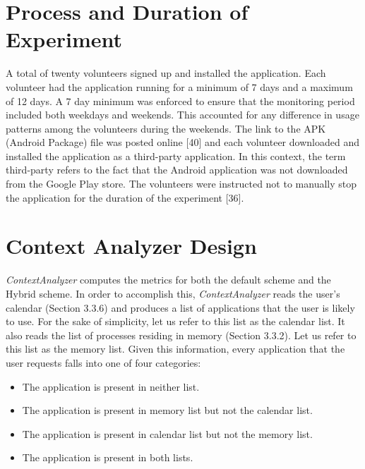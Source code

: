 \documentclass[12pt]{uthesis-v12}  %
\begin{document}
	\section{Process and Duration of Experiment}
		A total of twenty volunteers signed up and installed the application. Each volunteer had the application running for a minimum of 7 days and a maximum of 12 days. A 7 day minimum was enforced to ensure that the monitoring period included both weekdays and weekends. This accounted for any difference in usage patterns among the volunteers during the weekends. The link to the APK (Android Package) file was posted online [40] and each volunteer downloaded and installed the application as a third-party application. In this context, the term third-party refers to the fact that the Android application was not downloaded from the Google Play store. The volunteers were instructed not to manually stop the application for the duration of the experiment [36].
		 		 
	\section{Context Analyzer Design}
		{\em ContextAnalyzer} computes the metrics for both the default scheme and the Hybrid scheme. In order to  accomplish this, {\em ContextAnalyzer} reads the user's calendar (Section 3.3.6) and produces a list of applications that the user is likely to use. For the sake of simplicity, let us refer to this list as the calendar list. It also reads the list of processes residing in memory (Section 3.3.2). Let us refer to this list as the memory list. Given this information, every application that the user requests falls into one of four categories:
		
		\begin{itemize}
			\item The application is present in neither list.
			\item The application is present in memory list but not the calendar list.
			\item The application is present in calendar list but not the memory list.
			\item The application is present in both lists. 
		\end{itemize}  
		
\end{document}
